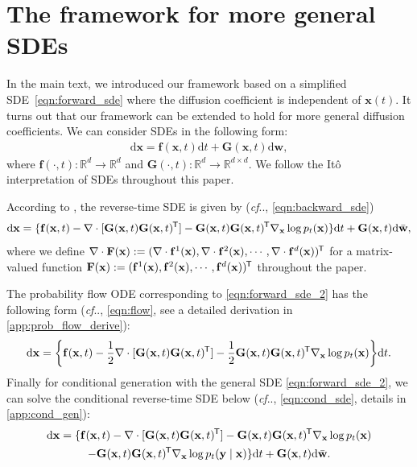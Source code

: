 \documentclass{article} %
\makeatletter
\newcommand*{\tran}{^{\mkern-1.5mu\mathsf{T}}}
\newcommand{\mbf}[1]{\mathbf{#1}}
\newcommand{\mbb}[1]{\mathbb{#1}}
\newcommand{\ud}{\mathrm{d}}
\def\@onedot{\ifx\@let@token.\else.\null\fi\xspace}
\DeclareRobustCommand\onedot{\futurelet\@let@token\@onedot}
\newcommand{\bfx}{\mathbf{x}}
\newcommand{\bfw}{\mathbf{w}}
\newcommand{\bff}{\mathbf{f}}
\newcommand{\bfy}{\mathbf{y}}
\newcommand{\bfG}{\mathbf{G}}
\def\cf{\emph{cf}\onedot}
\makeatother
\begin{document}
\section{The framework for more general SDEs}\label{app:general_sde}
In the main text, we introduced our framework based on a simplified SDE~\cref{eqn:forward_sde} where the diffusion coefficient is independent of $\bfx(t)$. It turns out that our framework can be extended to hold for more general diffusion coefficients. We can consider SDEs in the following form:
\begin{align}
    \ud \bfx = \bff(\bfx, t) \ud t + \mbf{G}(\bfx, t) \ud \bfw, \label{eqn:forward_sde_2}
\end{align}
where $\bff(\cdot, t): \mbb{R}^d \to \mbb{R}^d$ and $\mbf{G}(\cdot, t): \mbb{R}^d \to \mbb{R}^{d\times d}$. We follow the It\^{o} interpretation of SDEs throughout this paper.

According to \citep{Anderson1982-ny}, the reverse-time SDE is given by (\cf, \cref{eqn:backward_sde})
\begin{align}
    \ud \bfx = \{\bff(\bfx, t) - \nabla \cdot [\bfG(\bfx, t) \bfG(\bfx,t)\tran] - \bfG(\bfx,t)\bfG(\bfx,t)\tran  \nabla_\bfx  \log p_t(\bfx)\} \ud t + \mbf{G}(\bfx, t) \ud \bar{\bfw},\label{eqn:backward_sde_2}
\end{align}
where we define $\nabla\cdot \mbf{F}(\bfx) := (\nabla \cdot \bff^1(\bfx), \nabla\cdot \bff^2(\bfx), \cdots, \nabla\cdot \bff^d(\bfx))\tran$ for a matrix-valued function $\mbf{F}(\bfx) := (\bff^1(\bfx), \bff^2(\bfx), \cdots, \bff^d(\bfx))\tran$ throughout the paper. 

The probability flow ODE corresponding to \cref{eqn:forward_sde_2} has the following form (\cf, \cref{eqn:flow}, see a detailed derivation in \cref{app:prob_flow_derive}):
\begin{align}
    \ud \bfx = \bigg\{\bff(\bfx, t) - \frac{1}{2} \nabla \cdot [\bfG(\bfx, t)\bfG(\bfx, t)\tran] - \frac{1}{2} \bfG(\bfx, t)\bfG(\bfx, t)\tran \nabla_\bfx \log p_t(\bfx)\bigg\} \ud t. \label{eqn:flow_2}
\end{align}
Finally for conditional generation with the general SDE \cref{eqn:forward_sde_2}, we can solve the conditional reverse-time SDE below (\cf, \cref{eqn:cond_sde}, details in \cref{app:cond_gen}):
\begin{multline}
\ud \bfx = \{\bff(\bfx, t) - \nabla \cdot [\bfG(\bfx, t) \bfG(\bfx,t)\tran] - \bfG(\bfx,t)\bfG(\bfx,t)\tran  \nabla_\bfx  \log p_t(\bfx)\\ - \bfG(\bfx,t)\bfG(\bfx,t)\tran  \nabla_{\bfx}  \log p_t(\bfy \mid \bfx)\} \ud t + \mbf{G}(\bfx, t) \ud \bar{\bfw}.\label{eqn:cond_sde_2}
\end{multline}
\end{document}
